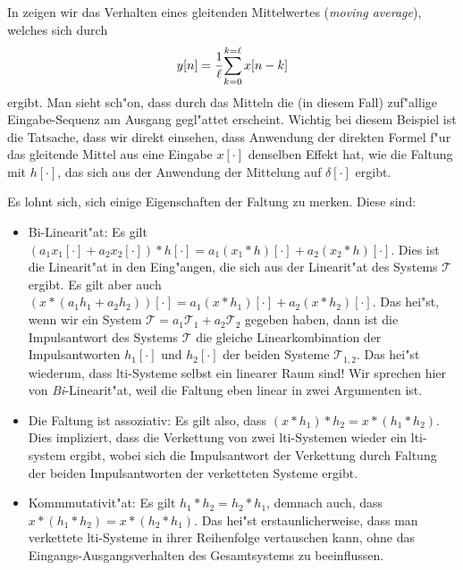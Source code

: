 In  zeigen wir das Verhalten eines gleitenden Mittelwertes (\emph{moving average}), welches sich durch
\[
y[n] = \frac{1}{\ell} {\sum\limits_{k=0}^{k=\ell}{x[n-k]}}
\]
ergibt.
Man sieht sch"on, dass durch das Mitteln die (in diesem Fall) zuf"allige Eingabe-Sequenz am Ausgang gegl"attet erscheint.
Wichtig bei diesem Beispiel ist die Tatsache, dass wir direkt einsehen, dass Anwendung der direkten Formel f"ur das gleitende Mittel aus eine Eingabe $x[\cdot]$ denselben Effekt hat, wie die Faltung mit $h[\cdot]$, das sich aus der Anwendung der Mittelung auf $\delta[\cdot]$ ergibt.

Es lohnt sich, sich einige Eigenschaften der Faltung zu merken. 
Diese sind:
\begin{itemize}
    \item Bi-Linearit"at: Es gilt $(a_1 x_1[\cdot] + a_2 x_2[\cdot]) \ast h[\cdot] = a_1 (x_1 \ast h)[\cdot] + a_2 (x_2 \ast h)[\cdot]$. 
    Dies ist die  Linearit"at in den Eing"angen, die sich aus der Linearit"at des Systems $\mathcal{T}$ ergibt. 
    Es gilt aber auch $(x \ast (a_1 h_1 + a_2 h_2))[\cdot] = a_1 (x \ast h_1)[\cdot] + a_2 (x \ast h_2)[\cdot]$.
    Das hei"st, wenn wir ein System $\mathcal{T} = a_1 \mathcal{T}_1 + a_2 \mathcal{T}_2$ gegeben haben, dann ist die Impulsantwort des Systems $\mathcal{T}$ die gleiche Linearkombination der Impulsantworten $h_1[\cdot]$ und $h_2[\cdot]$ der beiden Systeme $\mathcal{T}_{1,2}$.
    Das hei"st wiederum, dass \gls{lti}-Systeme selbst ein linearer Raum sind!
    Wir sprechen hier von \emph{Bi}-Linearit"at, weil die Faltung eben linear in zwei Argumenten ist.
    \item Die Faltung ist assoziativ: Es gilt also, dass $(x \ast h_1) \ast h_2 = x \ast (h_1 \ast h_2)$. 
    Dies impliziert, dass die Verkettung von zwei \gls{lti}-Systemen wieder ein \gls{lti}-system ergibt, wobei sich die Impulsantwort der Verkettung durch Faltung der beiden Impulsantworten der verketteten Systeme ergibt.
    \item Kommmutativit"at: Es gilt $h_1 \ast h_2 = h_2 \ast h_1$, demnach auch, dass $x \ast (h_1 \ast h_2) = x \ast (h_2 \ast h_1)$.
    Das hei"st erstaunlicherweise, dass man verkettete \gls{lti}-Systeme in ihrer Reihenfolge vertauschen kann, ohne das Eingangs-Ausgangsverhalten des Gesamtsystems zu beeinflussen.
\end{itemize}

